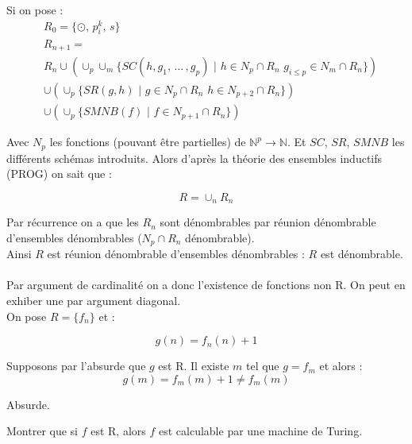 \documentclass[12pt,letterpaper,boxed]{hmcpset}
\begin{document}
\begin{solution}
Si on pose : 
\begin{align*}
& R_{0}  = \{ \odot, \, p^{k}_{i}, \, s \} \\
& R_{n+1}  = \\ 
& R_{n} \cup ( \cup_{p} \cup_{m} \{ SC(h,g_{1}, \, \dots \, , g_{p}) \, \, | \, \, h \in  N_{p} \cap R_{n} \, \, g_{i \leq p} \in N_{m} \cap R_{n}  \} ) \\ 
& \cup (\cup_{p} \{ SR(g,h) \, \, | \, \, g \in N_{p} \cap R_{n} \, \, h \in N_{p+2} \cap R_{n} \}) \\
& \cup (\cup_{p} \{ SMNB(f) \, \, | \, \, f \in N_{p+1} \cap R_{n} \})
 \end{align*}
 
 
 Avec $N_{p}$ les fonctions (pouvant être partielles) de $\mathbb{N}^{p} \to \mathbb{N}$. Et $SC$, $SR$, $SMNB$ les différents schémas introduits. Alors d'après la théorie des ensembles inductifs (PROG) on sait que :
 
 $$ R = \cup_{n} R_{n} $$

\noindent Par récurrence on a que les $R_{n}$ sont dénombrables par réunion dénombrable d'ensembles dénombrables ($N_{p}\cap R_{n}$ dénombrable). \\
Ainsi $R$ est réunion dénombrable d'ensembles dénombrables : $R$ est dénombrable. \\
\\
Par argument de cardinalité on a donc l'existence de fonctions non R. On peut en exhiber une par argument diagonal. \\
On pose $R = \{ f_{n} \}$ et : 

$$ g(n) = f_{n}(n) + 1$$

\noindent Supposons par l'absurde que $g$ est R. Il existe $m$ tel que $g = f_m$ et alors : 
$$ g(m) = f_{m}(m) + 1 \neq f_{m}(m)$$

\noindent Absurde.

\end{solution}

\begin{problem}[Question 5]
Montrer que si $f$ est R, alors $f$ est calculable par une machine de Turing.
\end{problem}
\end{document}
